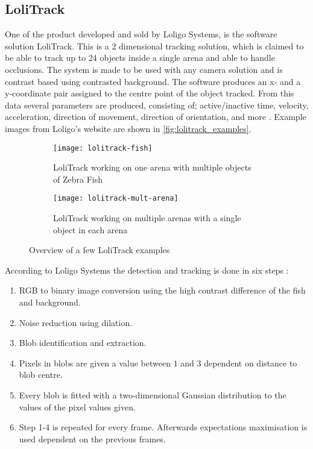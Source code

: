 \subsection{LoliTrack}
One of the product developed and sold by Loligo Systems, is the software solution LoliTrack. This is a 2 dimensional tracking solution, which is claimed to be able to track up to 24 objects inside a single arena and able to handle occlusions. The system is made to be used with any camera solution and is contrast based using contrasted background. The software produces an x- and a y-coordinate pair assigned to the centre point of the object tracked. From this data several parameters are produced, consisting of; active/inactive time, velocity, acceleration, direction of movement, direction of orientation, and more \citep{LoligoS}. Example images from Loligo's website are shown in \autoref{fig:lolitrack_examples}.

\begin{figure}[H]
	\centering
	\begin{subfigure}{0.45\textwidth}
		\texttt{[image: lolitrack-fish]}
		\caption{LoliTrack working on one arena with multiple objects of Zebra Fish}
	\end{subfigure}
	\begin{subfigure}{0.45\textwidth}
		\texttt{[image: lolitrack-mult-arena]}
		\caption{LoliTrack working on multiple arenas with a single object in each arena}
	\end{subfigure}
	\caption{Overview of a few LoliTrack examples \citep{LoligoS}}
	\label{fig:lolitrack_examples}
\end{figure}

According to Loligo Systems the detection and tracking is done in six steps \citep{LoligoS}:

\begin{enumerate}
	\item RGB to binary image conversion using the high contrast difference of the fish and background.
	\item Noise reduction using dilation.
	\item Blob identification and extraction.
	\item Pixels in blobs are given a value between $1$ and $3$ dependent on distance to blob centre.
	\item Every blob is fitted with a two-dimensional Gaussian distribution to the values of the pixel values given.
	\item Step 1-4 is repeated for every frame. Afterwards expectations maximisation is used dependent on the previous frames.
\end{enumerate}

